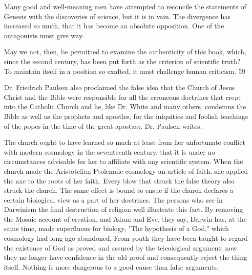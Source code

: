 Many good and well-meaning men have attempted to reconcile the statements of Genesis
with the discoveries of science, but it is in vain. The divergence has increased so much, that it
has become an absolute opposition. One of the antagonists must give way.

May we not, then, be permitted to examine the authenticity of this book, which, since the
second century, has been put forth as the criterion of scientific truth? To maintain itself in a
position so exalted, it must challenge human criticism. 59

Dr. Friedrich Paulsen also proclaimed the false idea that the Church of Jesus Christ and the
Bible were responsible for all the erroneous doctrines that crept into the Catholic Church and
he, like Dr. White and many others, condemns the Bible as well as the prophets and apostles,
for the iniquities and foolish teachings of the popes in the time of the great apostasy. Dr.
Paulsen writes:

The church ought to have learned so much at least from her unfortunate conflict with modern
cosmology in the seventeenth century, that it is under no circumstances advisable for her to
affiliate with any scientific system. When the church made the Aristotelian-Ptolemaic
cosmology an article of faith, she applied the axe to the roots of her faith. Every blow that
struck the false theory also struck the church. The same effect is bound to ensue if the church
declares a certain biological view as a part of her doctrines. The persons who see in
Darwinism the final destruction of religion well illustrate this fact. By removing the Mosaic
account of creation, and Adam and Eve, they say, Darwin has, at the same time, made
superfluous for biology, "The hypothesis of a God," which cosmology had long ago
abandoned. From youth they have been taught to regard the existence of God as proved and
assured by the teleological argument; now they no longer have confidence in the old proof
and consequently reject the thing itself. Nothing is more dangerous to a good cause than false
arguments.

